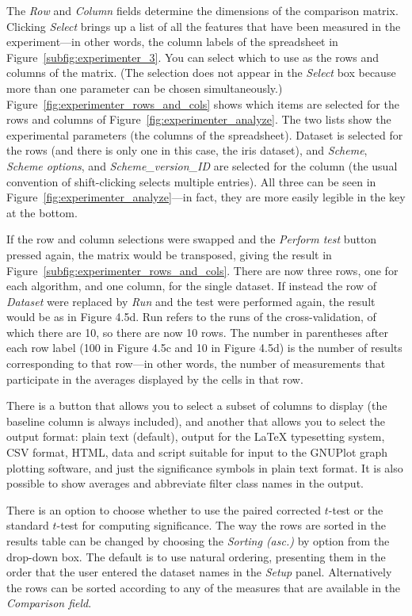 The \textit{Row} and \textit{Column} fields determine the dimensions
of the comparison matrix. Clicking \textit{Select} brings up a list of
all the features that have been measured in the experiment---in other
words, the column labels of the spreadsheet in
Figure~\ref{subfig:experimenter_3}. You can select which to use as the
rows and columns of the matrix. (The selection does not appear in the
\textit{Select} box because more than one parameter can be chosen
simultaneously.) Figure~\ref{fig:experimenter_rows_and_cols} shows
which items are selected for the rows and columns of
Figure~\ref{fig:experimenter_analyze}. The two lists show the
experimental parameters (the columns of the spreadsheet). Dataset is
selected for the rows (and there is only one in this case, the iris
dataset), and \textit{Scheme}, \textit{Scheme options}, and
\textit{Scheme\_version\_ID} are selected for the column (the usual
convention of shift-clicking selects multiple entries). All three can
be seen in Figure~\ref{fig:experimenter_analyze}---in fact, they are
more easily legible in the key at the bottom.

If the row and column selections were swapped and the \textit{Perform
  test} button pressed again, the matrix would be transposed, giving
the result in Figure~\ref{subfig:experimenter_rows_and_cols}. There
are now three rows, one for each algorithm, and one column, for the
single dataset. If instead the row of \textit{Dataset} were replaced
by \textit{Run} and the test were performed again, the result would be
as in Figure 4.5d. Run refers to the runs of the cross-validation, of
which there are 10, so there are now 10 rows. The number in
parentheses after each row label (100 in Figure 4.5c and 10 in Figure
4.5d) is the number of results corresponding to that row—in other
words, the number of measurements that participate in the averages
displayed by the cells in that row.

There is a button that allows you to select a subset of columns to
display (the baseline column is always included), and another that
allows you to select the output format: plain text (default), output
for the LaTeX typesetting system, CSV format, HTML, data and script
suitable for input to the GNUPlot graph plotting software, and just
the significance symbols in plain text format. It is also possible to
show averages and abbreviate filter class names in the output.

There is an option to choose whether to use the paired corrected
$t$-test or the standard $t$-test for computing significance. The way
the rows are sorted in the results table can be changed by choosing
the \textit{Sorting (asc.)} by option from the drop-down box. The
default is to use natural ordering, presenting them in the order that
the user entered the dataset names in the \textit{Setup}
panel. Alternatively the rows can be sorted according to any of the
measures that are available in the \textit{Comparison field}.

